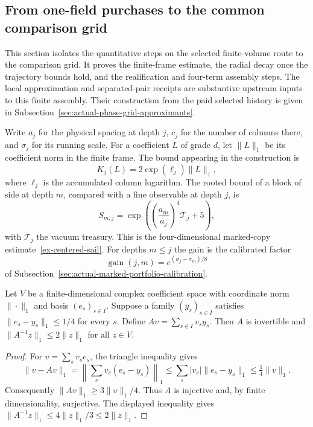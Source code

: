 \subsection{From one-field purchases to the common comparison grid}
\label{ex-public-grill-producer}

This section isolates the quantitative steps on the selected finite-volume
route to the comparison grid. It proves the finite-frame estimate, the
radial decay once the trajectory bounds hold, and the realification and
four-term assembly steps. The local approximation and separated-pair
receipts are substantive upstream inputs to this finite assembly. Their
construction from the paid selected history is given in
Subsection~\ref{sec:actual-phase-grid-approximants}.

Write $a_j$ for the physical spacing at depth $j$, $c_j$ for the number of
columns there, and $\sigma_j$ for its running scale. For a coefficient $L$
of grade $d$, let $\|L\|_1$ be its coefficient norm in the finite frame.
The bound appearing in the construction is
\[
  K_j(L)=2\exp(\ell_j)\|L\|_1,
\]
where $\ell_j$ is the accumulated column logarithm. The rooted bound of a
block of side at depth $m$, compared with a fine observable at depth $j$, is
\[
  S_{m,j}=\exp\!\left(\left(\frac{a_m}{a_j}\right)^4
                        \mathcal T_j+5\right),
\]
with $\mathcal T_j$ the vacuum treasury. This is the four-dimensional
marked-copy estimate~\eqref{ex-centered-sail}. For depths $m\le j$ the gain
is the calibrated factor
\[
  \operatorname{gain}(j,m)=e^{(\sigma_j-\sigma_m)/8}
\]
of Subsection~\ref{sec:actual-marked-portfolio-calibration}.

\begin{lemma}
\label{lem:ex-public-frame-recovery}
Let $V$ be a finite-dimensional complex coefficient space with coordinate
norm $\|\cdot\|_1$ and basis $(e_s)_{s\in I}$. Suppose a family
$(y_s)_{s\in I}$ satisfies $\|e_s-y_s\|_1\leq1/4$ for every $s$.
Define $A v=\sum_{s\in I}v_s y_s$. Then $A$ is invertible and
$\|A^{-1}z\|_1\leq2\|z\|_1$ for all $z\in V$.
\end{lemma}

\begin{proof}
For $v=\sum_s v_s e_s$, the triangle inequality gives
\[
 \|v-Av\|_1
   =\left\|\sum_s v_s(e_s-y_s)\right\|_1
   \leq\sum_s|v_s|\|e_s-y_s\|_1
   \leq\tfrac14\|v\|_1.
\]
Consequently $\|Av\|_1\geq3\|v\|_1/4$. Thus $A$ is injective and,
by finite dimensionality, surjective. The displayed inequality gives
$\|A^{-1}z\|_1\leq4\|z\|_1/3\leq2\|z\|_1$.
\end{proof}

